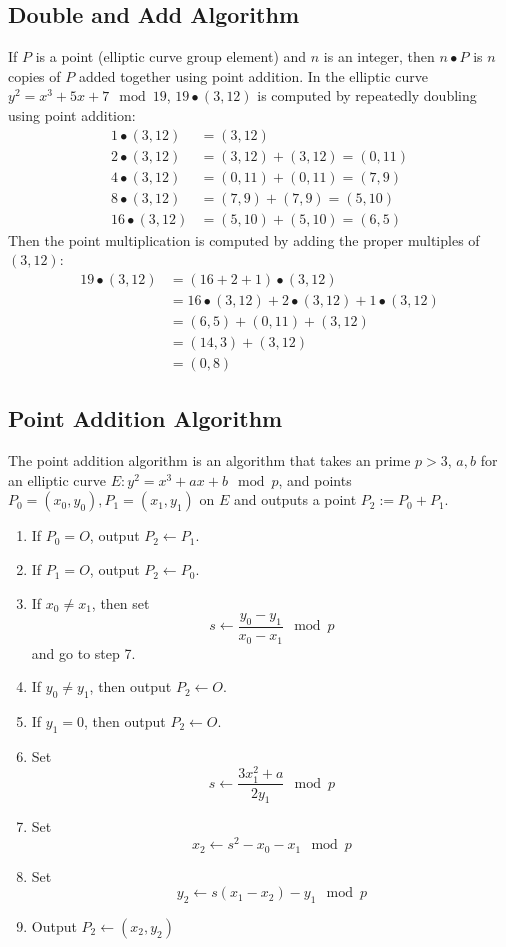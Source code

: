 \documentclass{math}
\begin{document}
\subsection*{Double and Add Algorithm}
If \( P \) is a point (elliptic curve group element) and \( n \) is an integer,
then \( n\bullet P \) is \( n \) copies of \( P \) added together using point
addition. In the elliptic curve \( y^2 = x^3+5x+7\mod19 \), \( 19\bullet(3,12)
\) is computed by repeatedly doubling using point addition:
\begin{align*}
  1\bullet(3,12) &= (3,12) \\
  2\bullet(3,12) &= (3,12)+(3,12) = (0,11) \\
  4\bullet(3,12) &= (0,11)+(0,11) = (7,9) \\
  8\bullet(3,12) &= (7,9)+(7,9) = (5,10) \\
  16\bullet(3,12) &= (5,10)+(5,10) = (6,5)
\end{align*}
Then the point multiplication is computed by adding the proper multiples of
\( (3,12) \):
\begin{align*}
  19\bullet(3,12) &= (16+2+1)\bullet(3,12) \\
  &= 16\bullet(3,12)+2\bullet(3,12)+1\bullet(3,12) \\
  &= (6,5)+(0,11)+(3,12) \\
  &= (14,3)+(3,12) \\
  &= (0,8)
\end{align*}

\subsection*{Point Addition Algorithm}
The point addition algorithm is an algorithm that takes an prime \( p > 3 \),
\( a,b \) for an elliptic curve \( E: y^2 = x^3+ax+b\mod p \), and points
\( P_0 = (x_0,y_0), P_1 = (x_1,y_1) \) on \( E \) and outputs a point
\( P_2 := P_0+P_1 \).
\begin{enumerate}
  \item If \( P_0 = O \), output \( P_2\leftarrow P_1 \).
  \item If \( P_1 = O \), output \( P_2\leftarrow P_0 \).
  \item If \( x_0\ne x_1 \), then set
  \[ s\leftarrow \frac{y_0-y_1}{x_0-x_1}\mod p \]
  and go to step 7.
  \item If \( y_0\ne y_1 \), then output \( P_2\leftarrow O \).
  \item If \( y_1 = 0 \), then output \( P_2\leftarrow O \).
  \item Set
  \[ s\leftarrow \frac{3x_1^2+a}{2y_1}\mod p \]
  \item Set
  \[ x_2\leftarrow s^2-x_0-x_1\mod p \]
  \item Set
  \[ y_2\leftarrow s(x_1-x_2)-y_1\mod p \]
  \item Output \( P_2\leftarrow (x_2,y_2) \)
\end{enumerate}
\end{document}
